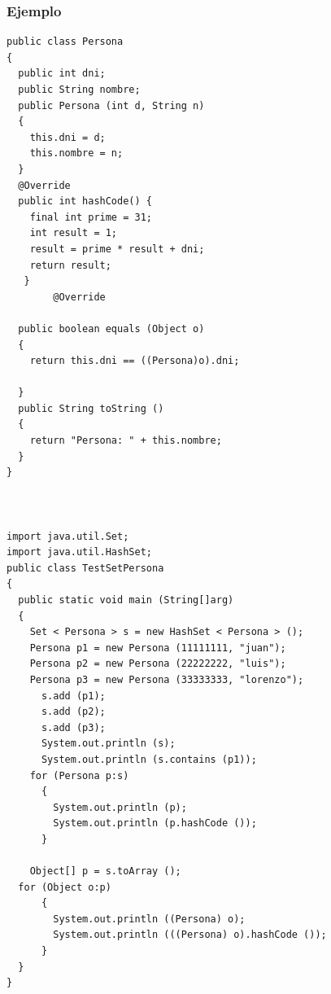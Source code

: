 \documentclass{beamer}
\begin{document}
\begin{frame}[fragile]
\frametitle{Ejemplo}
\begin{multicols}{2}
\begin{tiny}
\begin{verbatim}
public class Persona
{
  public int dni;
  public String nombre;
  public Persona (int d, String n)
  {
    this.dni = d;
    this.nombre = n;
  }
  @Override
  public int hashCode() {
    final int prime = 31;
    int result = 1;
    result = prime * result + dni;
    return result;
   }
        @Override

  public boolean equals (Object o)
  {
    return this.dni == ((Persona)o).dni;

  }
  public String toString ()
  {
    return "Persona: " + this.nombre;
  }
}



import java.util.Set;
import java.util.HashSet;
public class TestSetPersona
{
  public static void main (String[]arg)
  {
    Set < Persona > s = new HashSet < Persona > ();
    Persona p1 = new Persona (11111111, "juan");
    Persona p2 = new Persona (22222222, "luis");
    Persona p3 = new Persona (33333333, "lorenzo");
      s.add (p1);
      s.add (p2);
      s.add (p3);
      System.out.println (s);
      System.out.println (s.contains (p1));
    for (Persona p:s)
      {
        System.out.println (p);
        System.out.println (p.hashCode ());
      }

    Object[] p = s.toArray ();
  for (Object o:p)
      {
        System.out.println ((Persona) o);
        System.out.println (((Persona) o).hashCode ());
      }
  }
}
\end{verbatim}
\end{tiny}
\end{multicols}
\end{frame}
\end{document}
